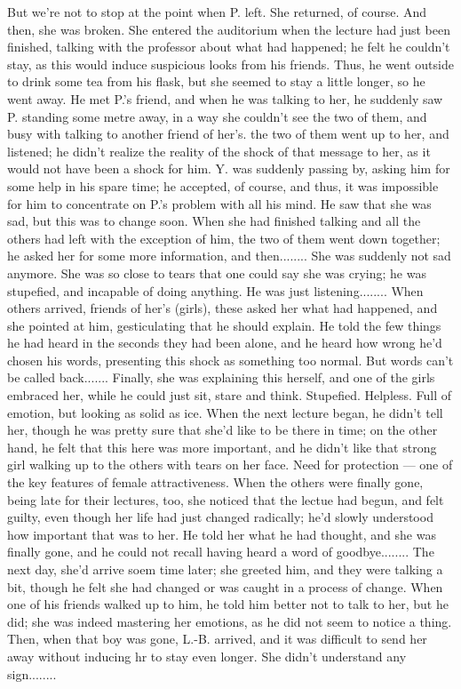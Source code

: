 But we're not to stop at the point when P. left. She returned, of course. And then, she was broken. She entered the auditorium when the lecture had just been finished, talking with the professor about what had happened; he felt he couldn't stay, as this would induce suspicious looks from his friends. Thus, he went outside to drink some tea from his flask, but she seemed to stay a little longer, so he went away. He met P.'s friend, and when he was talking to her, he suddenly saw P. standing some metre away, in a way she couldn't see the two of them, and busy with talking to another friend of her's. the two of them went up to her, and listened; he didn't realize the reality of the shock of that message to her, as it would not have been a shock for him. Y. was suddenly passing by, asking him for some help in his spare time; he accepted, of course, and thus, it was impossible for him to concentrate on P.'s problem with all his mind. He saw that she was sad, but this was to change soon. When she had finished talking and all the others had left with the exception of him, the two of them went down together; he asked her for some more information, and then........
She was suddenly not sad anymore. She was so close to tears that one could say she was crying; he was stupefied, and incapable of doing anything. He was just listening........
When others arrived, friends of her's (girls), these asked her what had happened, and she pointed at him, gesticulating that he should explain. He told the few things he had heard in the seconds they had been alone, and he heard how wrong he'd chosen his words, presenting this shock as something too normal. But words can't be called back.......
Finally, she was explaining this herself, and one of the girls embraced her, while he could just sit, stare and think. Stupefied. Helpless. Full of emotion, but looking as solid as ice. 
When the next lecture began, he didn't tell her, though he was pretty sure that she'd like to be there in time; on the other hand, he felt that this here was more important, and he didn't like that strong girl walking up to the others with tears on her face. 
Need for protection --- one of the key features of female attractiveness. 
When the others were finally gone, being late for their lectures, too, she noticed that the lectue had begun, and felt guilty, even though her life had just changed radically; he'd slowly understood how important that was to her. He told her what he had thought, and she was finally gone, and he could not recall having heard a word of goodbye........
The next day, she'd arrive soem time later; she greeted him, and they were talking a bit, though he felt she had changed or was caught in a process of change. When one of his friends walked up to him, he told him better not to talk to her, but he did; she was indeed mastering her emotions, as he did not seem to notice a thing. Then, when that boy was gone, L.-B. arrived, and it was difficult to send her away without inducing hr to stay even longer. She didn't understand any sign........

